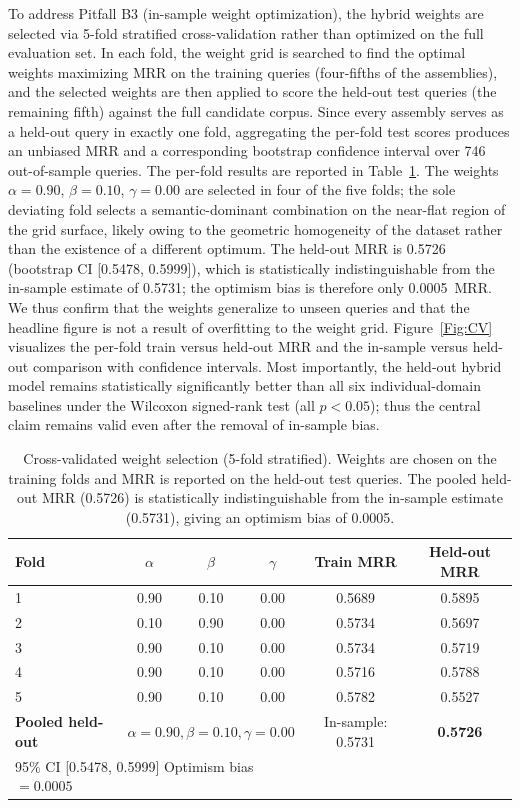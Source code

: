 \documentclass[preprint,12pt]{elsarticle}
\begin{document}
To address Pitfall B3 (in-sample weight optimization), the hybrid weights are selected via 5-fold stratified cross-validation rather than optimized on the full evaluation set.
In each fold, the weight grid is searched to find the optimal weights maximizing MRR on the training queries (four-fifths of the assemblies), and the selected weights are then applied to score the held-out test queries (the remaining fifth) against the full candidate corpus.
Since every assembly serves as a held-out query in exactly one fold, aggregating the per-fold test scores produces an unbiased MRR and a corresponding bootstrap confidence interval over 746 out-of-sample queries.
The per-fold results are reported in Table~\ref{tab:CV}.
The weights $\alpha{=}0.90$, $\beta{=}0.10$, $\gamma{=}0.00$ are selected in four of the five folds; the sole deviating fold selects a semantic-dominant combination on the near-flat region of the grid surface, likely owing to the geometric homogeneity of the dataset rather than the existence of a different optimum.
The held-out MRR is 0.5726 (bootstrap CI [0.5478, 0.5999]), which is statistically indistinguishable from the in-sample estimate of 0.5731; the optimism bias is therefore only 0.0005~MRR.
We thus confirm that the weights generalize to unseen queries and that the headline figure is not a result of overfitting to the weight grid.
Figure~\ref{Fig:CV} visualizes the per-fold train versus held-out MRR and the in-sample versus held-out comparison with confidence intervals.
Most importantly, the held-out hybrid model remains statistically significantly better than all six individual-domain baselines under the Wilcoxon signed-rank test (all $p < 0.05$); thus the central claim remains valid even after the removal of in-sample bias.

\begin{table}[!ht]
\centering
\caption{Cross-validated weight selection (5-fold stratified). Weights are chosen on the training folds and MRR is reported on the held-out test queries. The pooled held-out MRR (0.5726) is statistically indistinguishable from the in-sample estimate (0.5731), giving an optimism bias of 0.0005.}
\label{tab:CV}
\begin{tabular}{lccccc}
\toprule
\textbf{Fold} & \textbf{$\alpha$} & \textbf{$\beta$} & \textbf{$\gamma$} & \textbf{Train MRR} & \textbf{Held-out MRR} \\
\midrule
1 & 0.90 & 0.10 & 0.00 & 0.5689 & 0.5895 \\
2 & 0.10 & 0.90 & 0.00 & 0.5734 & 0.5697 \\
3 & 0.90 & 0.10 & 0.00 & 0.5734 & 0.5719 \\
4 & 0.90 & 0.10 & 0.00 & 0.5716 & 0.5788 \\
5 & 0.90 & 0.10 & 0.00 & 0.5782 & 0.5527 \\
\midrule
\textbf{Pooled held-out} & \multicolumn{3}{c}{$\alpha{=}0.90,\beta{=}0.10,\gamma{=}0.00$} & In-sample: 0.5731 & \textbf{0.5726} \\
\multicolumn{4}{l}{95\% CI [0.5478, 0.5999] \quad Optimism bias $=0.0005$} & & \\
\bottomrule
\end{tabular}
\end{table}
\end{document}
